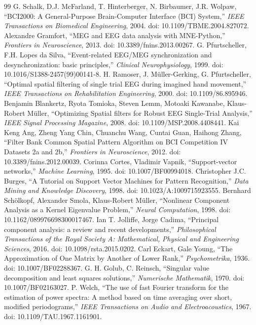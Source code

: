 \begin{thebibliography}{99}
 G. Schalk, D.J. McFarland, T. Hinterberger, N. Birbaumer, J.R. Wolpaw, ``BCI2000: A General-Purpose Brain-Computer Interface (BCI) System,'' \emph{IEEE Transactions on Biomedical Engineering}, 2004. doi: 10.1109/TBME.2004.827072.
 Alexandre Gramfort, ``MEG and EEG data analysis with MNE-Python,'' \emph{Frontiers in Neuroscience}, 2013. doi: 10.3389/fnins.2013.00267.
 G. Pfurtscheller, F.H. Lopes da Silva, ``Event-related EEG/MEG synchronization and desynchronization: basic principles,'' \emph{Clinical Neurophysiology}, 1999. doi: 10.1016/S1388-2457(99)00141-8.
 H. Ramoser, J. M{\"u}ller-Gerking, G. Pfurtscheller, ``Optimal spatial filtering of single trial EEG during imagined hand movement,'' \emph{IEEE Transactions on Rehabilitation Engineering}, 2000. doi: 10.1109/86.895946.
 Benjamin Blankertz, Ryota Tomioka, Steven Lemm, Motoaki Kawanabe, Klaus-Robert M{\"u}ller, ``Optimizing Spatial filters for Robust EEG Single-Trial Analysis,'' \emph{IEEE Signal Processing Magazine}, 2008. doi: 10.1109/MSP.2008.4408441.
 Kai Keng Ang, Zheng Yang Chin, Chuanchu Wang, Cuntai Guan, Haihong Zhang, ``Filter Bank Common Spatial Pattern Algorithm on BCI Competition IV Datasets 2a and 2b,'' \emph{Frontiers in Neuroscience}, 2012. doi: 10.3389/fnins.2012.00039.
 Corinna Cortes, Vladimir Vapnik, ``Support-vector networks,'' \emph{Machine Learning}, 1995. doi: 10.1007/BF00994018.
 Christopher J.C. Burges, ``A Tutorial on Support Vector Machines for Pattern Recognition,'' \emph{Data Mining and Knowledge Discovery}, 1998. doi: 10.1023/A:1009715923555.
 Bernhard Sch{\"o}lkopf, Alexander Smola, Klaus-Robert M{\"u}ller, ``Nonlinear Component Analysis as a Kernel Eigenvalue Problem,'' \emph{Neural Computation}, 1998. doi: 10.1162/089976698300017467.
 Ian T. Jolliffe, Jorge Cadima, ``Principal component analysis: a review and recent developments,'' \emph{Philosophical Transactions of the Royal Society A: Mathematical, Physical and Engineering Sciences}, 2016. doi: 10.1098/rsta.2015.0202.
 Carl Eckart, Gale Young, ``The Approximation of One Matrix by Another of Lower Rank,'' \emph{Psychometrika}, 1936. doi: 10.1007/BF02288367.
 G. H. Golub, C. Reinsch, ``Singular value decomposition and least squares solutions,'' \emph{Numerische Mathematik}, 1970. doi: 10.1007/BF02163027.
 P. Welch, ``The use of fast Fourier transform for the estimation of power spectra: A method based on time averaging over short, modified periodograms,'' \emph{IEEE Transactions on Audio and Electroacoustics}, 1967. doi: 10.1109/TAU.1967.1161901.

\end{thebibliography}
